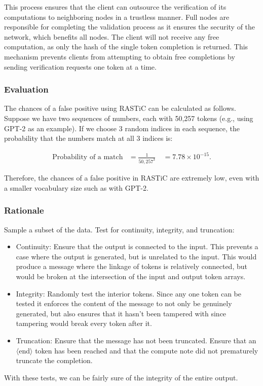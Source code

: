 \documentclass{article}
\begin{document}
This process ensures that the client can outsource the verification of its computations to neighboring nodes in a trustless manner.
Full nodes are responsible for completing the validation process as it ensures the security of the network, which benefits all nodes. 
The client will not receive any free computation, as only the hash of the single token completion is returned. 
This mechanism prevents clients from attempting to obtain free completions by sending verification requests one token at a time.

\subsubsection{Evaluation}

The chances of a false positive using \ac{RASTiC} can be calculated as follows. 
Suppose we have two sequences of numbers, each with 50,257 tokens (e.g., using GPT-2 as an example). 
If we choose 3 random indices in each sequence, the probability that the numbers match at all 3 indices is:

\begin{align*}
\text{Probability of a match} &= \frac{1}{50,257^3} \
&= 7.78 \times 10^{-15}.
\end{align*}

Therefore, the chances of a false positive in \ac{RASTiC} are extremely low, even with a smaller vocabulary size such as with GPT-2.

\subsubsection{Rationale}
Sample a subset of the data.
Test for continuity, integrity, and truncation:
\begin{itemize}
    \item Continuity: Ensure that the output is connected to the input. This prevents a case where the output is generated, but is unrelated to the input. 
    This would produce a message where the linkage of tokens is relatively connected, but would be broken at the intersection of the input and output token arrays.
    \item Integrity: Randomly test the interior tokens. 
    Since any one token can be tested it enforces the content of the message to not only be genuinely generated, but also ensures that it hasn't been tampered with since tampering would break every token after it.
    \item Truncation: Ensure that the message has not been truncated. Ensure that an $\langle$end$\rangle$ token has been reached and that the compute note did not prematurely truncate the completion.
\end{itemize}
 With these tests, we can be fairly sure of the integrity of the entire output.
\end{document}
